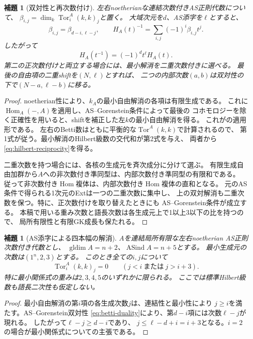 \documentclass[11pt,a4paper]{ltjsarticle}
\newtheorem{lemma}[theorem]{補題}
\theoremstyle{definition}
\newcommand{\Tor}{\operatorname{Tor}}
\newcommand{\Hom}{\operatorname{Hom}}
\newcommand{\gldim}{\operatorname{gldim}}
\begin{document}
\begin{lemma}[双対性と再次数付け]\label{lem:duality-regrading}
左右noetherianな連結次数付きAS正則代数について、
$\beta_{i,j}=\dim_k\Tor_i^A(k,k)_j$と置く。
大域次元を$d$、AS添字を$\ell$とすると、
\begin{equation}\label{eq:betti-duality}
\beta_{i,j}=\beta_{d-i,\ell-j},\qquad
H_A(t)^{-1}=\sum_{i,j}(-1)^i\beta_{i,j}t^j.
\end{equation}
したがって
\begin{equation}\label{eq:hilbert-reciprocity}
H_A(t^{-1})=(-1)^dt^\ell H_A(t).
\end{equation}
第二の正次数付けと両立する場合には、最小解消を二重次数付きに選べる。
最後の自由項の二重shiftを$(N,\ell)$とすれば、
二つの内部次数$(a,b)$は双対性の下で$(N-a,\ell-b)$に移る。
\end{lemma}

\begin{proof}
noetherian性により、$k_A$の最小自由解消の各項は有限生成である。
これに$\Hom_A(-,A)$を適用し、AS--Gorenstein条件によって最後の
コホモロジーを除く正確性を用いると、shiftを補正した左$k$の最小自由解消を得る。
これが\cite[Lemma 1.1]{LPWZ}の適用形である。
左右のBetti数はともに平衡的な$\Tor^A(k,k)$で計算されるので、
第1式が従う。最小解消のHilbert級数の交代和が第2式を与え、
両者から\eqref{eq:hilbert-reciprocity}を得る。

二重次数を持つ場合には、各核の生成元を斉次成分に分けて選ぶ。
有限生成自由加群から$A$への非次数付き準同型は、内部次数付き準同型の有限和である。
従って非次数付き$\Hom$複体は、内部次数付き$\Hom$複体の直和となる。
元のAS条件で得られる1次元のExtは一つの二重次数に集中し、
上の双対解消も二重次数を保つ。特に、正次数付けを取り替えたときにも
AS--Gorenstein条件が成立する。
本稿で用いる重み次数と語長次数は各生成元上で1以上3以下の比を持つので、
局所有限性と有限GK成長も保たれる。
\end{proof}

\begin{lemma}[AS添字による四本幅の解消]\label{lem:index-four-strands}
$A$を連結局所有限な左右noetherian AS正則次数付き代数とし、
$\gldim A=n+2$、$\operatorname{ASind}A=n+5$とする。
最小生成元の次数は$(1^n,2,3)$とする。
このとき全ての$i,j$について
\[
\Tor_i^A(k,k)_j=0\qquad(j<i\ \text{または}\ j>i+3).
\]
特に最小関係式の重みは$2,3,4,5$のいずれかに限られる。
ここでは標準Hilbert級数も語長二次性も仮定しない。
\end{lemma}
\begin{proof}
最小自由解消の第$i$項の各生成次数$j$は、連結性と最小性により
$j\ge i$を満たす。AS--Gorenstein双対性
\eqref{eq:betti-duality}により、第$d-i$項には次数$\ell-j$が現れる。
したがって$\ell-j\ge d-i$であり、
$j\le\ell-d+i=i+3$となる。$i=2$の場合が最小関係式についての主張である。
\end{proof}
\end{document}
